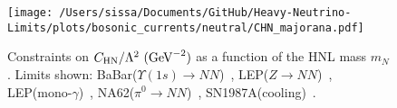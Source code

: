 \documentclass{revtex4-1}%
\begin{document}
%
\normalsize%


\begin{figure}[h!]%
\centering%
\texttt{[image: /Users/sissa/Documents/GitHub/Heavy-Neutrino-Limits/plots/bosonic\_currents/neutral/CHN\_majorana.pdf]}%
\caption{Constraints on $C_\text{HN}/\Lambda^2 ~(\rm{GeV}^{-2})$ as a function of the HNL mass $m_N$. Limits shown: BaBar($\Upsilon(1s)\to NN$)~\cite{BaBar:2009gco}, LEP($Z \to NN$)~\cite{Workman:2022ynf}, LEP(mono-$\gamma$)~\cite{Fox:2011fx}, NA62($\pi^0 \to NN$)~\cite{NA62:2020pwi}, SN1987A(cooling)~\cite{DeRocco:2019jti}.}%
\end{figure}

%
%
%
\end{document}
